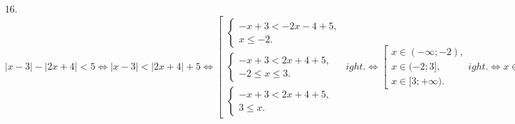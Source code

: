 16. $|x-3|-|2x+4|<5\Leftrightarrow |x-3|<|2x+4|+5 \Leftrightarrow \left[\begin{array}{l}\begin{cases} -x+3<-2x-4+5,\\ x\leqslant -2.\end{cases}\\
\begin{cases} -x+3<2x+4+5,\\ -2\leqslant x\leqslant 3 .\end{cases}\\\begin{cases} -x+3<2x+4+5,\\ 3\leqslant x.\end{cases}\end{array}
ight.\Leftrightarrow
\left[\begin{array}{l}
x\in(-\infty;-2),\\
x\in(-2;3],\\
x\in[3;+\infty).\end{array}
ight.\Leftrightarrow x\in(-\infty;-2)\cup(-2;+\infty)$\\
